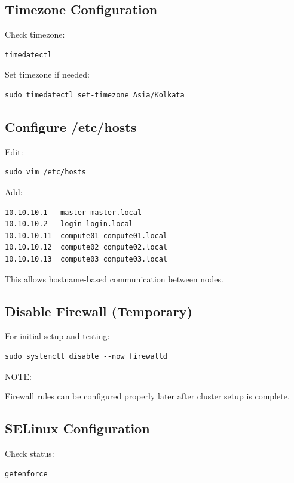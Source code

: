 \documentclass[11pt]{article}
\begin{document}
\subsection{Timezone Configuration}
\label{sec:orgd03c13a}

Check timezone:

\begin{verbatim}
timedatectl
\end{verbatim}

Set timezone if needed:

\begin{verbatim}
sudo timedatectl set-timezone Asia/Kolkata
\end{verbatim}
\subsection{Configure /etc/hosts}
\label{sec:orgf79fe38}

Edit:

\begin{verbatim}
sudo vim /etc/hosts
\end{verbatim}

Add:

\begin{verbatim}
10.10.10.1   master master.local
10.10.10.2   login login.local
10.10.10.11  compute01 compute01.local
10.10.10.12  compute02 compute02.local
10.10.10.13  compute03 compute03.local
\end{verbatim}
This allows hostname-based communication between nodes.
\subsection{Disable Firewall (Temporary)}
\label{sec:orgee30e97}

For initial setup and testing:
\begin{verbatim}
sudo systemctl disable --now firewalld
\end{verbatim}
NOTE:

Firewall rules can be configured properly later after cluster setup is complete.
\subsection{SELinux Configuration}
\label{sec:org98e3577}

Check status:

\begin{verbatim}
getenforce
\end{verbatim}
\end{document}
